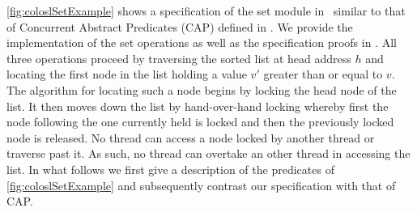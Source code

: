 \fig\ref{fig:coloslSetExample} shows a specification of the set module in \colosl\ similar to that of Concurrent Abstract Predicates (CAP) defined in \cite{cap-ecoop10}. We provide the implementation of the set operations as well as the specification proofs in \cite{colosl-tr14}. All three operations proceed by  traversing the sorted list at head address $h$ and locating the first node in the list holding a value $v'$ greater than or equal to $v$. The algorithm for locating such a node begins by locking the head node of the list. It then moves down the list by hand-over-hand locking whereby first the node following the one currently held is locked and then the previously locked node is released. No thread can access a node locked by another thread or traverse past it. As such, no thread can overtake an other thread in accessing the list. 
In what follows we first give a description of the predicates of \fig\ref{fig:coloslSetExample} and subsequently contrast our specification with that of CAP.
%	
%		
%	
%	
%		
%	
